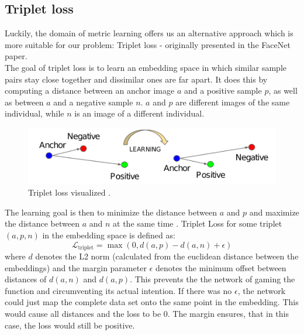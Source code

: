 \subsection{Triplet loss}
Luckily, the domain of metric learning offers us an alternative approach which is more suitable for our problem: Triplet loss - originally presented in the FaceNet \cite{Schroff_2015} paper. \\
The goal of triplet loss is to learn an embedding space in which similar sample pairs stay close together and dissimilar ones are far apart. It does this by computing a distance between an anchor image \(a\) and a positive sample \(p\), as well as between \(a\) and a negative sample \(n\). \(a\) and \(p\) are different images of the same individual, while \(n\) is an image of a different individual.

\begin{figure}[ht] 
        \centering \includegraphics[width=1\columnwidth]{figures/triplet_loss.png}
        \caption{\label{fig:triplet_loss_img} Triplet loss visualized \protect\cite{Schroff_2015}.}
\end{figure}

\noindent The learning goal is then to minimize the distance between \(a\) and \(p\) and maximize the distance between \(a\) and \(n\) at the same time \cite{weng2021contrastive}. Triplet Loss for some triplet \((a,p,n)\) in the embedding space is defined as:
\[ \mathcal{L}_\text{triplet} = \max\left(0,d(a,p)-d(a,n) + \epsilon\right) \]
where \(d\) denotes the L2 norm (calculated from the euclidean distance between the embeddings) and the margin parameter \(\epsilon\) denotes the minimum offset between distances of \(d(a,n)\) and \(d(a,p)\). This prevents the the network of gaming the function and circumventing its actual intention. If there was no \(\epsilon\), the network could just map the complete data set onto the same point in the embedding. This would cause all distances and the loss to be 0. The margin ensures, that in this case, the loss would still be positive. \cite{hav4ik2021deepmetriclearning}\\

